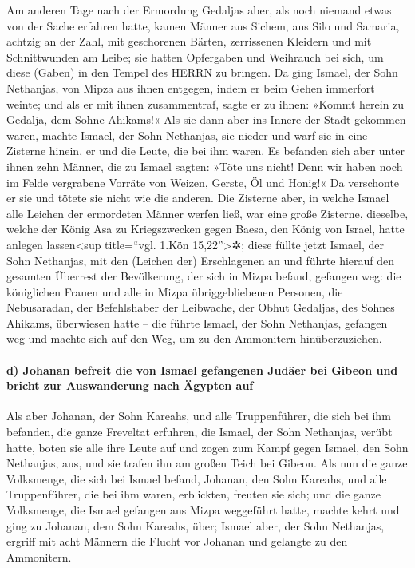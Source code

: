 Am anderen Tage nach der Ermordung Gedaljas aber, als noch
niemand etwas von der Sache erfahren hatte, kamen Männer
aus Sichem, aus Silo und Samaria, achtzig an der Zahl, mit geschorenen
Bärten, zerrissenen Kleidern und mit Schnittwunden am Leibe; sie hatten
Opfergaben und Weihrauch bei sich, um diese (Gaben) in den Tempel des
HERRN zu bringen. Da ging Ismael, der Sohn Nethanjas, von
Mipza aus ihnen entgegen, indem er beim Gehen immerfort weinte; und als
er mit ihnen zusammentraf, sagte er zu ihnen: »Kommt herein zu Gedalja,
dem Sohne Ahikams!« Als sie dann aber ins Innere der Stadt
gekommen waren, machte Ismael, der Sohn Nethanjas, sie nieder und warf
sie in eine Zisterne hinein, er und die Leute, die bei ihm waren.
Es befanden sich aber unter ihnen zehn Männer, die zu
Ismael sagten: »Töte uns nicht! Denn wir haben noch im Felde vergrabene
Vorräte von Weizen, Gerste, Öl und Honig!« Da verschonte er sie und
tötete sie nicht wie die anderen. Die Zisterne aber, in
welche Ismael alle Leichen der ermordeten Männer werfen ließ, war eine
große Zisterne, dieselbe, welche der König Asa zu Kriegszwecken gegen
Baesa, den König von Israel, hatte anlegen lassen\textless sup
title=``vgl. 1.Kön 15,22''\textgreater✲; diese füllte jetzt Ismael, der
Sohn Nethanjas, mit den (Leichen der) Erschlagenen an und
führte hierauf den gesamten Überrest der Bevölkerung, der sich in Mizpa
befand, gefangen weg: die königlichen Frauen und alle in Mizpa
übriggebliebenen Personen, die Nebusaradan, der Befehlshaber der
Leibwache, der Obhut Gedaljas, des Sohnes Ahikams, überwiesen hatte --
die führte Ismael, der Sohn Nethanjas, gefangen weg und machte sich auf
den Weg, um zu den Ammonitern hinüberzuziehen.

\hypertarget{d-johanan-befreit-die-von-ismael-gefangenen-juduxe4er-bei-gibeon-und-bricht-zur-auswanderung-nach-uxe4gypten-auf}{%
\paragraph{d) Johanan befreit die von Ismael gefangenen Judäer bei
Gibeon und bricht zur Auswanderung nach Ägypten
auf}\label{d-johanan-befreit-die-von-ismael-gefangenen-juduxe4er-bei-gibeon-und-bricht-zur-auswanderung-nach-uxe4gypten-auf}}

Als aber Johanan, der Sohn Kareahs, und alle
Truppenführer, die sich bei ihm befanden, die ganze Freveltat erfuhren,
die Ismael, der Sohn Nethanjas, verübt hatte, boten sie
alle ihre Leute auf und zogen zum Kampf gegen Ismael, den Sohn
Nethanjas, aus, und sie trafen ihn am großen Teich bei Gibeon.
Als nun die ganze Volksmenge, die sich bei Ismael befand,
Johanan, den Sohn Kareahs, und alle Truppenführer, die bei ihm waren,
erblickten, freuten sie sich; und die ganze Volksmenge,
die Ismael gefangen aus Mizpa weggeführt hatte, machte kehrt und ging zu
Johanan, dem Sohn Kareahs, über; Ismael aber, der Sohn
Nethanjas, ergriff mit acht Männern die Flucht vor Johanan und gelangte
zu den Ammonitern.

